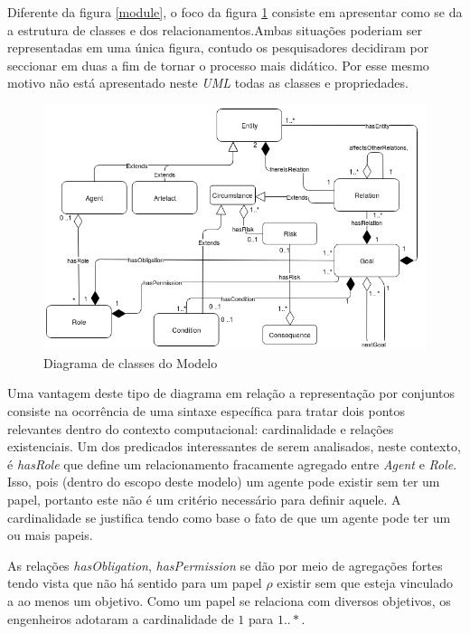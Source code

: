 Diferente da figura \ref{module}, o foco da figura \ref{classdiagrama} consiste em apresentar como se da a estrutura de classes e dos relacionamentos.Ambas situações poderiam ser representadas em uma única figura, contudo os pesquisadores decidiram por seccionar em duas a fim de tornar o processo mais didático. Por esse mesmo motivo não está apresentado neste \textit{UML} todas as classes e propriedades.  

\begin{figure}[H]
  \centering
  \includegraphics[width=1\linewidth]{figure/Class.png} 
  \caption{Diagrama de classes do Modelo }
  \label{classdiagrama}
\end{figure}

Uma vantagem deste tipo de diagrama em relação a representação por conjuntos consiste na ocorrência de uma sintaxe específica para tratar dois pontos relevantes dentro do contexto computacional: cardinalidade e relações existenciais. Um dos predicados interessantes de serem analisados, neste contexto, é \textit{hasRole} que define um relacionamento fracamente agregado entre \textit{Agent} e \textit{Role}. Isso, pois (dentro do escopo deste modelo) um agente pode existir sem ter um papel, portanto este não é um critério necessário para definir aquele. A cardinalidade se justifica tendo como base o fato de que um agente pode ter um ou mais papeis. 

As relações \textit{hasObligation}, \textit{hasPermission} se dão por meio de agregações fortes tendo vista que não há sentido para um papel $\rho$ existir sem que esteja vinculado a ao menos um objetivo. Como um papel se relaciona com diversos objetivos, os engenheiros adotaram a cardinalidade de $1$ para $1 .. *$.

